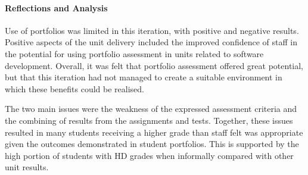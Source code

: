 \paragraph{Reflections and Analysis} %
\label{ssub:analysis}

Use of portfolios was limited in this iteration, with positive and negative results. Positive aspects of the unit delivery included the improved confidence of staff in the potential for using portfolio assessment in units related to software development. Overall, it was felt that portfolio assessment offered great potential, but that this iteration had not managed to create a suitable environment in which these benefits could be realised.

The two main issues were the weakness of the expressed assessment criteria and the combining of results from the assignments and tests. Together, these issues resulted in many students receiving a higher grade than staff felt was appropriate given the outcomes demonstrated in student portfolios. This is supported by the high portion of students with HD grades when informally compared with other unit results.

